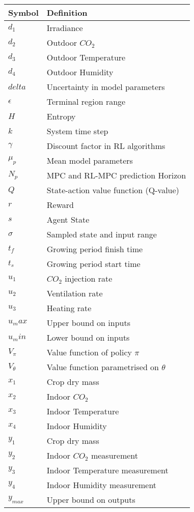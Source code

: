 \begin{longtable}{p{2.5cm}p{8cm}}
	\toprule
	Symbol & Definition \\
	\midrule\endhead %
	$d_1$ & Irradiance \\
	$d_2$ & Outdoor $CO_2$ \\
	$d_3$ & Outdoor Temperature \\
	$d_4$ & Outdoor Humidity \\
	$delta$& Uncertainty in model parameters \\
	$\epsilon$& Terminal region range \\
	$H$ & Entropy \\
	$k$ & System time step \\
	$\gamma$ & Discount factor in RL algorithms \\
	$\mu_p$& Mean model parameters \\
	$N_p$ & MPC and RL-MPC prediction Horizon \\
	$Q$ & State-action value function (Q-value) \\
	$r$ & Reward \\
	$s$ & Agent State \\
	$\sigma$& Sampled state and input range \\
	$t_f$ & Growing period finish time \\
	$t_s$ & Growing period start time \\
	$u_1$ & $CO_2$ injection rate \\
	$u_2$ & Ventilation rate \\
	$u_3$ & Heating rate \\
	$u_max$ & Upper bound on inputs \\
	$u_min$ & Lower bound on inputs \\
	$V_{\pi}$ & Value function of policy $\pi$ \\
	$V_{\theta}$ & Value function parametrised on $\theta$ \\
	$x_1$ & Crop dry mass \\
	$x_2$ & Indoor $CO_2$ \\
	$x_3$ & Indoor Temperature \\
	$x_4$ & Indoor Humidity \\
	$y_1$ & Crop dry mass \\
	$y_2$ & Indoor $CO_2$ measurement \\
	$y_3$ & Indoor Temperature measurement \\
	$y_4$ & Indoor Humidity measurement \\
	$y_{max}$ & Upper bound on outputs \\

\end{longtable}
